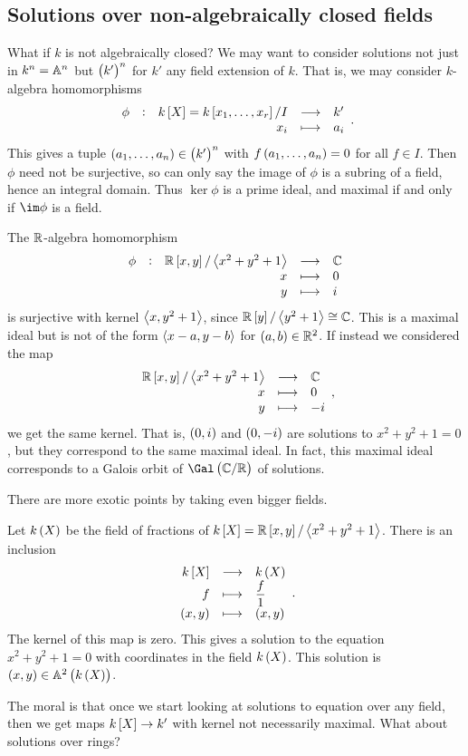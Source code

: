 \subsection{Solutions over non-algebraically closed fields}

What if $ k $ is not algebraically closed? We may want to consider solutions not just in $ k^n = \AA^n $ but $ \br{k'}^n $ for $ k' $ any field extension of $ k $. That is, we may consider $ k $-algebra homomorphisms
$$ \function[\phi]{k\sbr{X} = k\sbr{x_1, \dots, x_r} / I}{k'}{x_i}{a_i}. $$
This gives a tuple $ \br{a_1, \dots, a_n} \in \br{k'}^n $ with $ f\br{a_1, \dots, a_n} = 0 $ for all $ f \in I $. Then $ \phi $ need not be surjective, so can only say the image of $ \phi $ is a subring of a field, hence an integral domain. Thus $ \ker \phi $ is a prime ideal, and maximal if and only if $ \im \phi $ is a field.

\begin{example*}
The $ \RR $-algebra homomorphism
$$ \functions[\phi]{\RR\sbr{x, y} / \abr{x^2 + y^2 + 1}}{\CC}{x}{0}{y}{i} $$
is surjective with kernel $ \abr{x, y^2 + 1} $, since $ \RR\sbr{y} / \abr{y^2 + 1} \cong \CC $. This is a maximal ideal but is not of the form $ \abr{x - a, y - b} $ for $ \br{a, b} \in \RR^2 $. If instead we considered the map
$$ \functions{\RR\sbr{x, y} / \abr{x^2 + y^2 + 1}}{\CC}{x}{0}{y}{-i}, $$
we get the same kernel. That is, $ \br{0, i} $ and $ \br{0, -i} $ are solutions to $ x^2 + y^2 + 1 = 0 $, but they correspond to the same maximal ideal. In fact, this maximal ideal corresponds to a Galois orbit of $ \Gal\br{\CC / \RR} $ of solutions.
\end{example*}


There are more exotic points by taking even bigger fields.

\begin{example*}
Let $ k\br{X} $ be the field of fractions of $ k\sbr{X} = \RR\sbr{x, y} / \abr{x^2 + y^2 + 1} $. There is an inclusion
$$ \functions{k\sbr{X}}{k\br{X}}{f}{\dfrac{f}{1}}{\br{x, y}}{\br{x, y}}. $$
The kernel of this map is zero. This gives a solution to the equation $ x^2 + y^2 + 1 = 0 $ with coordinates in the field $ k\br{X} $. This solution is $ \br{x, y} \in \AA^2\br{k\br{X}} $.
\end{example*}

The moral is that once we start looking at solutions to equation over any field, then we get maps $ k\sbr{X} \to k' $ with kernel not necessarily maximal. What about solutions over rings?

